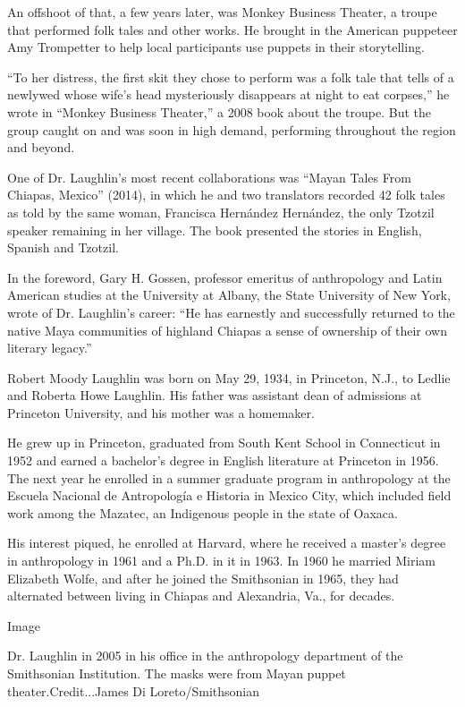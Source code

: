 An offshoot of that, a few years later, was Monkey Business Theater, a
troupe that performed folk tales and other works. He brought in the
American puppeteer Amy Trompetter to help local participants use puppets
in their storytelling.

``To her distress, the first skit they chose to perform was a folk tale
that tells of a newlywed whose wife's head mysteriously disappears at
night to eat corpses,'' he wrote in ``Monkey Business Theater,'' a 2008
book about the troupe. But the group caught on and was soon in high
demand, performing throughout the region and beyond.

One of Dr. Laughlin's most recent collaborations was ``Mayan Tales From
Chiapas, Mexico'' (2014), in which he and two translators recorded 42
folk tales as told by the same woman, Francisca Hernández Hernández, the
only Tzotzil speaker remaining in her village. The book presented the
stories in English, Spanish and Tzotzil.

In the foreword, Gary H. Gossen, professor emeritus of anthropology and
Latin American studies at the University at Albany, the State University
of New York, wrote of Dr. Laughlin's career: ``He has earnestly and
successfully returned to the native Maya communities of highland Chiapas
a sense of ownership of their own literary legacy.''

Robert Moody Laughlin was born on May 29, 1934, in Princeton, N.J., to
Ledlie and Roberta Howe Laughlin. His father was assistant dean of
admissions at Princeton University, and his mother was a homemaker.

He grew up in Princeton, graduated from South Kent School in Connecticut
in 1952 and earned a bachelor's degree in English literature at
Princeton in 1956. The next year he enrolled in a summer graduate
program in anthropology at the Escuela Nacional de Antropología e
Historia in Mexico City, which included field work among the Mazatec, an
Indigenous people in the state of Oaxaca.

His interest piqued, he enrolled at Harvard, where he received a
master's degree in anthropology in 1961 and a Ph.D. in it in 1963. In
1960 he married Miriam Elizabeth Wolfe, and after he joined the
Smithsonian in 1965, they had alternated between living in Chiapas and
Alexandria, Va., for decades.

Image

Dr. Laughlin in 2005 in his office in the anthropology department of the
Smithsonian Institution. The masks were from Mayan puppet
theater.Credit...James Di Loreto/Smithsonian

